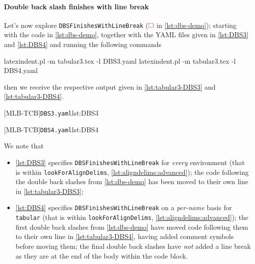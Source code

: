  \paragraph{Double back slash finishes with line break}
  \begin{example}
  Let's now explore \texttt{DBSFinishesWithLineBreak} ($\color{red}\square$ in
  \cref{lst:dbs-demo}); starting with the code in \cref{lst:dbs-demo}, together with the
  YAML files given in \cref{lst:DBS3} and \cref{lst:DBS4} and running the following
  commands   

  \begin{commandshell}
latexindent.pl -m tabular3.tex -l DBS3.yaml
latexindent.pl -m tabular3.tex -l DBS4.yaml
\end{commandshell}

  then we receive the respective output given in \cref{lst:tabular3-DBS3} and
  \cref{lst:tabular3-DBS4}.

  \begin{cmhtcbraster}
   [MLB-TCB]{\texttt{DBS3.yaml}}{lst:DBS3}
  \end{cmhtcbraster}

  \begin{cmhtcbraster}
   [MLB-TCB]{\texttt{DBS4.yaml}}{lst:DBS4}
  \end{cmhtcbraster}

  We note that
  \begin{itemize}
   \item \cref{lst:DBS3} specifies \texttt{DBSFinishesWithLineBreak} for
         \emph{every} environment (that is within \texttt{lookForAlignDelims},
         \vref{lst:aligndelims:advanced});
         the code following the double back slashes from \cref{lst:dbs-demo} has been moved to
         their own line in \cref{lst:tabular3-DBS3};
   \item \cref{lst:DBS4} specifies \texttt{DBSFinishesWithLineBreak} on a
         \emph{per-name} basis for \texttt{tabular} (that is within \texttt{lookForAlignDelims},
         \vref{lst:aligndelims:advanced});
         the first double back slashes from \cref{lst:dbs-demo} have moved code following them to
         their own line in \cref{lst:tabular3-DBS4}, having added comment symbols before moving
         them; the final double back slashes have \emph{not} added a line break as they are at the
         end of the body within the code block.
  \end{itemize}
  \end{example}

